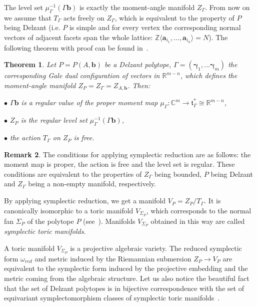 \documentclass[jsg]{IP_v1_forauthors}
\newtheorem{theo}{Theorem}[section]
\theoremstyle{definition}
\newtheorem{rema}[theo]{Remark}
\numberwithin{equation}{section}
\begin{document}
The level set $\mu_\Gamma^{-1}(\Gamma \boldsymbol{b})$ is exactly the moment-angle manifold $Z_\Gamma$. From now on we assume that $T_\Gamma$ acts freely on $Z_\Gamma$, which is equivalent to the property of $P$ being Delzant (i.e. $P$ is simple and for every vertex the corresponding normal vectors of adjacent facets span the whole lattice: ${\mathbb Z} \langle \boldsymbol{a}_{i_1},\ldots,\boldsymbol{a}_{i_n} \rangle = N$).
The following theorem with proof can be found in~\cite[Theorem 6.3.1]{BP}.
\begin{theo}
Let $P=P(A,\boldsymbol{b})$ be a Delzant polytope, $\Gamma=(\boldsymbol{\gamma}_1,...\boldsymbol{\gamma}_m)$ the corresponding Gale dual configuration of vectors in ${\mathbb R}^{m-n}$, which defines the moment-angle manifold $Z_P=Z_\Gamma=Z_{A,\boldsymbol{b}}$. Then:

\medskip

\noindent $\bullet$ $\Gamma \boldsymbol{b}$ is a regular value of the proper moment map $\mu_\Gamma \colon{\mathbb C}^m \rightarrow \mathfrak{t}^*_\Gamma \cong {\mathbb R}^{m-n}$,

\medskip

\noindent $\bullet$ $Z_P$ is the regular level set $\mu_\Gamma^{-1}(\Gamma \boldsymbol{b})$,

\medskip

\noindent $\bullet$ the action $T_\Gamma$ on $Z_P$ is free.
\end{theo}
\begin{rema}
The conditions for applying symplectic reduction are as follows: the moment map is proper, the action is free and the level set is regular. These conditions are equivalent to the properties of $Z_\Gamma$ being bounded, $P$ being Delzant and $Z_\Gamma$ being a non-empty manifold, respectively.
\end{rema}

By applying symplectic reduction, we get a manifold $V_P=Z_P/T_\Gamma$. It is canonically isomorphic to a toric manifold $V_{\Sigma_P}$, which corresponds to the normal fan $\Sigma_P$ of the polytope $P$ (see~\cite[Theorem 5.5.4]{BP}). Manifolds $V_{\Sigma_P}$ obtained in this way are called {\itshape symplectic toric manifolds}.

A toric manifold $V_{\Sigma_P}$ is a projective algebraic variety. The reduced symplectic form $\omega_{red}$ and metric induced by the Riemannian submersion  $Z_P \rightarrow V_P$ are equivalent to the symplectic form induced by the projective embedding and the metric coming from the algebraic structure. Let us also notice the beautiful fact that the set of Delzant polytopes is in bijective correspondence with the set of equivariant symplectomorphism classes of symplectic toric manifolds~\cite{Delz}.
\end{document}
